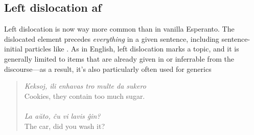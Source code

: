 \subsection{Left dislocation af}

Left dislocation is now way more common than in vanilla Esperanto. The dislocated element precedes \emph{everything} in a given sentence, including sentence-initial particles like . As in English, left dislocation marks a topic, and it is generally limited to items that are already given in or inferrable from the discourse---as a result, it's also particularly often used for generics

\begin{quote}
    \textit{Keksoj, ili enhavas tro multe da sukero}\\
    Cookies, they contain too much sugar.\\
    \\
    \textit{La aŭto, ĉu vi lavis ĝin?}\\
    The car, did you wash it?
\end{quote}